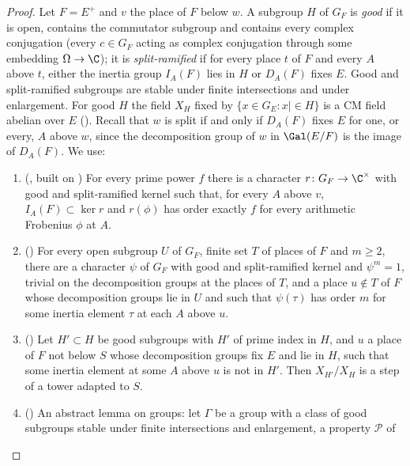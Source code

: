 \begin{proof}
Let $F=E^+$ and $v$ the place of $F$ below $w$. A subgroup $H$ of $G_F$ is \emph{good} if it is open, contains the
commutator subgroup and contains every complex conjugation (every $c\in G_F$ acting as complex conjugation through some
embedding $\Omega\to\C$); it is \emph{split-ramified} if for every place $t$ of $F$ and every $A$ above $t$, either the
inertia group $I_A(F)$ lies in $H$ or $D_A(F)$ fixes $E$. Good and split-ramified subgroups are stable under finite
intersections and under enlargement. For good $H$ the field $X_H$ fixed by $\{x\in G_E:x|\in H\}$ is a CM field abelian
over $E$ (). Recall that $w$ is split if and only if
$D_A(F)$ fixes $E$ for one, or every, $A$ above $w$, since the decomposition group of $w$ in $\Gal(E/F)$ is the image of
$D_A(F)$. We use:
\begin{enumerate}[label=(\roman*),nosep]
\item (, built on
  ) For every prime power $f$ there is a character
  $r\colon G_F\to\C^\times$ with good and split-ramified kernel such that, for every $A$ above $v$, $I_A(F)\subset\ker r$
  and $r(\phi)$ has order exactly $f$ for every arithmetic Frobenius $\phi$ at $A$.
\item () For every open subgroup $U$ of $G_F$,
  finite set $T$ of places of $F$ and $m\ge2$, there are a character $\psi$ of $G_F$ with good and split-ramified kernel and
  $\psi^m=1$, trivial on the decomposition groups at the places of $T$, and a place $u\notin T$ of $F$ whose decomposition
  groups lie in $U$ and such that $\psi(\tau)$ has order $m$ for some inertia element $\tau$ at each $A$ above $u$.
\item () Let $H'\subset H$ be good subgroups with
  $H'$ of prime index in $H$, and $u$ a place of $F$ not below $S$ whose decomposition groups fix $E$ and lie in $H$, such
  that some inertia element at some $A$ above $u$ is not in $H'$. Then $X_{H'}/X_H$ is a step of a tower adapted to $S$.
\item () An abstract lemma on groups: let $\Gamma$
  be a group with a class of good subgroups stable under finite intersections and enlargement, a property $\mathcal P$ of

\end{enumerate}
\end{proof}
